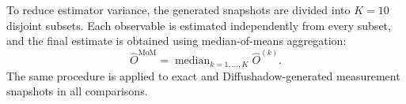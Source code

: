 \documentclass[11pt]{article}
\newcommand{\placeholdergraphics}[1]{%
  {\ttfamily\small \textbackslash includegraphics[width=\textbackslash linewidth]\{\detokenize{#1}\}}%
}
\newcommand{\suppsection}[1]{%
  \phantomsection
  \section*{#1}
  \addcontentsline{toc}{section}{#1}
}
\newcommand{\suppsubsection}[1]{%
  \phantomsection
  \subsection*{#1}
  \addcontentsline{toc}{subsection}{#1}
}
\begin{document}
To reduce estimator variance, the generated snapshots are divided into
\(K=10\) disjoint subsets. Each observable is estimated independently
from every subset, and the final estimate is obtained using
median-of-means aggregation:
\begin{equation}
\widehat{O}^{\mathrm{MoM}}
=
\operatorname{median}_{k=1,\ldots,K}
\widehat{O}^{(k)}.
\end{equation}
The same procedure is applied to exact and Diffushadow-generated
measurement snapshots in all comparisons.













\end{document}
